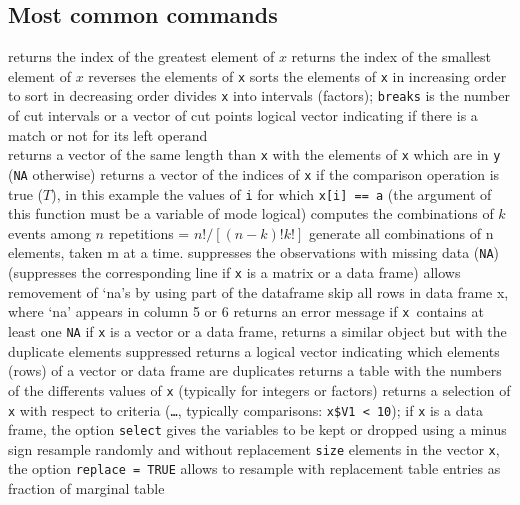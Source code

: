 \subsection{Most common commands}{}
	{ returns the index of the greatest element of $x$}
	{ returns the index of the smallest element of $x$}
	{ reverses the elements of {\tt x}}
	{sorts the elements of {\tt x} in increasing order}
	{to sort in decreasing order}
	{divides {\tt x} into intervals (factors); {\tt breaks} is the number of cut intervals or a vector of cut points}
	{logical vector indicating if there is a match or not for its left operand\\}
	{returns a vector of the same length than {\tt x}
    with the elements of {\tt x} which are in {\tt y} ({\tt NA}
    otherwise)}
	{returns a vector of the indices of {\tt x} if the
comparison operation is true ($T$), in this example the values of {\tt i} for
which {\tt x[i] == a} (the argument of this function must be a variable of mode
logical)}
	{ computes the combinations of $k$ events among $n$ repetitions = $n!/[(n-k)!k!]$}
	{ generate all combinations of n elements, taken m at a time.}
	{suppresses the observations with missing data ({\tt NA}) (suppresses the corresponding line if {\tt x} is a matrix or a data frame)}
	{allows removement of `na's by using part of the dataframe} %
	{skip all rows in data frame x, where `na' appears in column 5 or 6}
	{returns an error message if {\tt x }contains at least one {\tt NA}}
	{if {\tt x} is a vector or a data frame, returns a similar object but with the duplicate elements suppressed}
	{returns a logical vector indicating which elements (rows) of a vector or data frame are duplicates}
	{returns a table with the numbers of the differents values of {\tt x} (typically for integers or factors)}
	{returns a selection of {\tt x} with respect to criteria ({\tt \ldots}, typically comparisons: {\tt x\$V1 < 10}); if {\tt x} is a data frame, the option {\tt select} gives the variables to be kept or dropped using a minus sign}
	{resample randomly and without replacement {\tt size}
elements in the vector {\tt x}, the option {\tt replace = TRUE} allows to
resample with replacement}
	{table entries as fraction of marginal table}

